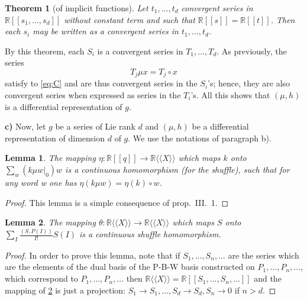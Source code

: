 \documentclass[a4paper,12pt]{article}
\newtheorem*{theorem*}{Theorem}
\newtheorem{lemma}{Lemma}
\newcommand{\R}{\mathbb{R}}
\newcommand{\Rxx}{\R\langle\langle X\rangle\rangle}
\begin{document}
\begin{theorem*}[of implicit functions]
	Let $t_1, \ldots, t_d$ convergent series in $\R\left[\left[s_1, \ldots, s_d\right]\right]$ without constant term and such that $\R[[s]]=\R[[t]]$. Then each $s_i$ may be written as a convergent series in $t_1, \ldots, t_d$.
\end{theorem*}


By this theorem, each $S_i$ is a convergent series in ${T}_1, \ldots, T_d$. As previously, the series
\begin{equation*}
	T_j \mu x=T_j \circ x
\end{equation*}
satisfy to \eqref{eq:C} and are thus convergent series in the $S_i$'s; hence, they are also convergent series when expressed as series in the ${T}_i$'s. All this shows that $(\mu, {h})$ is a differential representation of ${g}$.

\bigskip


\textbf{c)} Now, let $g$ be a series of Lie rank $d$ and $(\mu, h)$ be a differential representation of dimension $d$ of $g$. We use the notations of paragraph b).

\begin{lemma} \label{l:6}
	The mapping $\eta: \R[[{q}]] \rightarrow \Rxx$ which maps ${k}$ onto $\sum_{{w}}\left(\left.{k} \mu {w}\right|_0\right) {w}$ is a
	continuous homomorphism (for the shuffle), such that for any word w one has $\eta(k \mu w)=\eta(k) \circ w$.
\end{lemma}

\begin{proof}
	This lemma is a simple consequence of \cite{4} prop.\ III.\ 1.
\end{proof}


\begin{lemma} \label{l:7}
	The mapping $\theta: \Rxx \to \Rxx$ which maps $S$ onto $\sum_I \frac{(S, P(I))}{I !} S(I)$
	is a continuous shuffle homomorphism.
\end{lemma}

\begin{proof}
	In order to prove this lemma, note that if $S_1, \ldots, S_n, \ldots$ are the series which are the elements of the dual basis of the P-B-W basis constructed on $P_1, \ldots, P_n, \ldots$, which correspond to $P_1, \ldots, P_n, \ldots$ then $\Rxx =\R [[S_1, \ldots, S_n, \ldots]]$ and the mapping of \cref{l:7} is just a projection: $S_1 \rightarrow S_1, \ldots, S_{{d}} \rightarrow S_{{d}}, S_{{n}} \rightarrow 0$ if ${n}>{d}$.
\end{proof}
\end{document}
